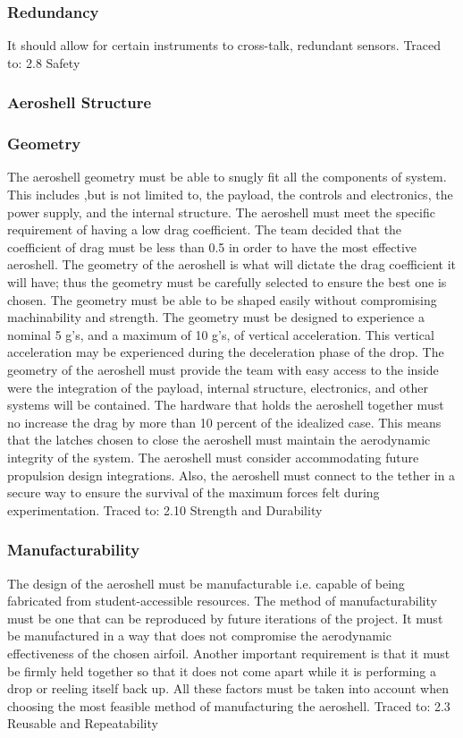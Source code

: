 \subsubsection*{Redundancy}
\indent\indent It should allow for certain instruments to cross-talk, redundant sensors. Traced to: 2.8 Safety 

\subsubsection{Aeroshell Structure}

\subsubsection*{Geometry}
\indent\indent The aeroshell geometry must be able to snugly fit all the components of system. This includes ,but is not limited to, the payload, the controls and electronics, the power supply, and the internal structure. The aeroshell must meet the specific requirement of having a low drag coefficient. The team decided that the coefficient of drag must be less than 0.5 in order to have the most effective aeroshell. The geometry of the aeroshell is what will dictate the drag coefficient it will have; thus the geometry must be carefully selected to ensure the best one is chosen. The geometry must be able to be shaped easily without compromising machinability and strength. The geometry must be designed to experience a nominal 5 g’s, and a maximum of 10 g’s, of vertical acceleration. This vertical acceleration may be experienced during the deceleration phase of the drop. The geometry of the aeroshell must provide the team with easy access to the inside were the integration of the payload, internal structure, electronics, and other systems will be contained. The hardware that holds the aeroshell together must no increase the drag by more than 10 percent of the idealized case. This means that the latches chosen to close the aeroshell must maintain the aerodynamic integrity of the system. The aeroshell must consider accommodating future propulsion design integrations. Also, the aeroshell must connect to the tether in a secure way to ensure the survival of the maximum forces felt during experimentation. Traced to: 2.10 Strength and Durability


\subsubsection*{Manufacturability}
\indent\indent The design of the aeroshell must be manufacturable i.e. capable of being fabricated from student-accessible resources. The method of manufacturability must be one that can be reproduced by future iterations of the project. It must be manufactured in a way that does not compromise the aerodynamic effectiveness of the chosen airfoil. Another important requirement is that it must be firmly held together so that it does not come apart while it is performing a drop or reeling itself back up. All these factors must be taken into account when choosing the most feasible method of manufacturing the aeroshell. Traced to: 2.3 Reusable and Repeatability

